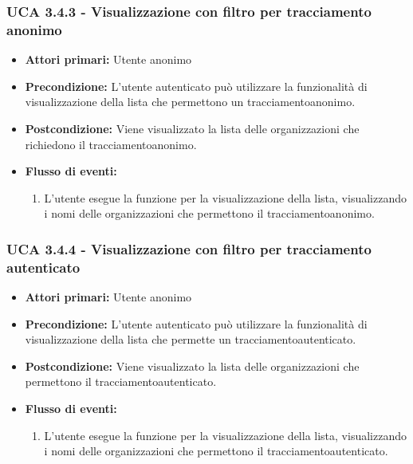 \subsubsection{UCA 3.4.3 - Visualizzazione con filtro per tracciamento anonimo}%
\begin{itemize}
	\item \textbf{Attori primari:} Utente anonimo
	\item \textbf{Precondizione:} L'utente autenticato può utilizzare la funzionalità di visualizzazione della lista che permettono un tracciamentoanonimo.
	\item \textbf{Postcondizione:} Viene visualizzato la lista delle organizzazioni che richiedono il tracciamentoanonimo.
	\item \textbf{Flusso di eventi:}
		\begin{enumerate}
		\item L'utente esegue la funzione per la visualizzazione della lista, visualizzando i nomi delle organizzazioni che permettono il tracciamentoanonimo.
	\end{enumerate}
\end{itemize}

\subsubsection{UCA 3.4.4 - Visualizzazione con filtro per tracciamento autenticato}%
\begin{itemize}
	\item \textbf{Attori primari:} Utente anonimo
	\item \textbf{Precondizione:} L'utente autenticato può utilizzare la funzionalità di visualizzazione della lista che permette un tracciamentoautenticato.
	\item \textbf{Postcondizione:} Viene visualizzato la lista delle organizzazioni che permettono il tracciamentoautenticato.
	\item \textbf{Flusso di eventi:}
	\begin{enumerate}
		\item L'utente esegue la funzione per la visualizzazione della lista, visualizzando i nomi delle organizzazioni che permettono il tracciamentoautenticato.
	\end{enumerate}
\end{itemize}

